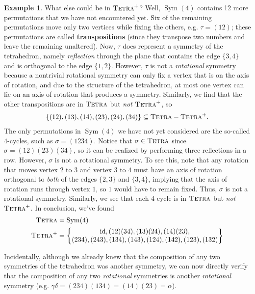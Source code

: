 \documentclass[11pt]{amsart}
\theoremstyle{plain}
\theoremstyle{definition}
\newtheorem{example}{Example}
\theoremstyle{remark}
\DeclareMathOperator{\Sym}{Sym}
\newcommand{\symtetra}{\textsc{Tetra}}
\newcommand{\rsymtetra}{\textsc{Tetra}^+}
\DeclareMathOperator{\id}{id}
\begin{document}
\begin{example}
What else could be in $\rsymtetra$? Well, $\Sym(4)$ contains 12 more permutations that we have not encountered yet. Six of the remaining permutations move only two vertices while fixing the others, e.g. $\tau = (12)$; these permutations are called \textbf{transpositions} (since they transpose two numbers and leave the remaining unaltered). Now, $\tau$ does  represent a symmetry of the tetrahedron, namely \emph{reflection} through the plane that contains the edge $\{3,4\}$ and is orthogonal to the edge $\{1,2\}$. However, $\tau$  is not a \emph{rotational} symmetry because a nontrivial rotational symmetry can only fix a vertex that is on the axis of rotation, and due to the structure of the tetrahedron, at most one vertex can lie on an axis of rotation that produces a symmetry. Similarly, we find that the other transpositions are in $\symtetra$ but \emph{not} $\rsymtetra$, so 
\[\{(12), (13), (14), (23), (24), (34)\} \subseteq \symtetra - \rsymtetra.\]
The only permutations in $\Sym(4)$ we have not yet considered are the so-called $4$-cycles, such as $\sigma = (1234)$. Notice that $\sigma\in \symtetra$ since $\sigma = (12)(23)(34)$, so it can be realized by performing three reflections in a row. However, $\sigma$ is not a rotational symmetry. To see this, note that any rotation that moves vertex $2$ to $3$ and vertex $3$ to $4$ must have an axis of rotation orthogonal to \emph{both} of the edges $\{2,3\}$ and $\{3,4\}$, implying that the axis of rotation runs through vertex $1$, so $1$ would have to remain fixed. Thus, $\sigma$ is not a rotational symmetry. Similarly, we see that each $4$-cycle is in $\symtetra$ but \emph{not}  $\rsymtetra$. In conclusion, we've found  
\begin{align*}
\symtetra &= \Sym(4)\\
\rsymtetra &= \begin{Bmatrix}
\id,(12)(34), (13)(24), (14)(23),  \\
(234), (243), (134), (143), (124), (142), (123), (132)
\end{Bmatrix}
\end{align*}

Incidentally, although we already knew that the composition of any two symmetries of the tetrahedron was another symmetry, we can now directly verify that the composition of any two \emph{rotational} symmetries is another \emph{rotational} symmetry (e.g. $\gamma\delta = (234)(134) = (14)(23) = \alpha$).
\end{example}

\end{document}
